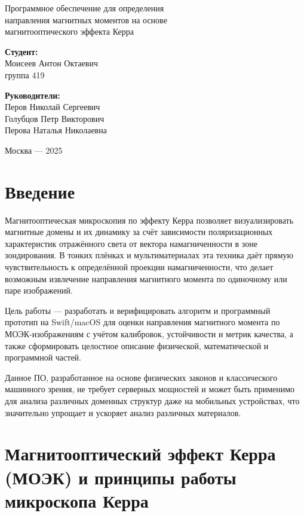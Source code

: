 \documentclass[12pt,a4paper]{article}
\numberwithin{equation}{section}
\begin{document}
\begin{titlepage}
\centering
{\Large Программное обеспечение для определения\\[2pt]
направления магнитных моментов на основе\\[2pt]
магнитооптического эффекта Керра\par}
\vspace{16mm}
\begin{flushleft}
\textbf{Студент:}\\
Моисеев Антон Октаевич\\
группа 419

\vspace{6mm}
\textbf{Руководители:}\\
Перов Николай Сергеевич\\
Голубцов Петр Викторович\\
Перова Наталья Николаевна
\end{flushleft}
\vfill
Москва — 2025
\end{titlepage}

\tableofcontents
\newpage

\section{Введение}
Магнитооптическая микроскопия по эффекту Керра позволяет визуализировать магнитные домены и их динамику за счёт зависимости поляризационных характеристик отражённого света от вектора намагниченности в зоне зондирования. В тонких плёнках и мультиматериалах эта техника даёт прямую чувствительность к определённой проекции намагниченности, что делает возможным извлечение направления магнитного момента по одиночному или паре изображений. 

Цель работы — разработать и верифицировать алгоритм и программный прототип на Swift/macOS для оценки направления магнитного момента по МОЭК-изображениям с учётом калибровок, устойчивости и метрик качества, а также сформировать целостное описание физической, математической и программной частей.

Данное ПО, разработанное на основе физических законов и классического машинного зрения, не требует серверных мощностей и может быть применимо для анализа различных доменных структур даже на мобильных устройствах, что значительно упрощает и ускоряет анализ различных материалов. 

\section{Магнитооптический эффект Керра (МОЭК) и принципы работы микроскопа Керра}
\end{document}
